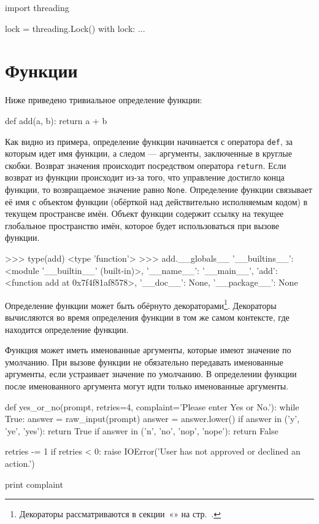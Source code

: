 \begin{pylst}{}{}
import threading

lock = threading.Lock()
with lock: ...
\end{pylst}

\section{Функции}
Ниже приведено тривиальное определение функции:
\begin{pylst}{}{}
def add(a, b):
    return a + b
\end{pylst}

Как видно из примера, определение функции начинается с оператора \lstinline{def}, за которым идет имя функции, а следом — аргументы, заключенные в круглые скобки. Возврат значения происходит посредством оператора \lstinline{return}. Если возврат из функции происходит из-за того, что управление достигло конца функции, то возвращаемое значение равно \lstinline{None}. Определение функции связывает её имя с объектом функции (обёрткой над действительно исполняемым кодом) в текущем пространсве имён. Объект функции содержит ссылку на текущее глобальное пространство имён, которое будет использоваться при вызове функции.
\begin{pylst}{}{}
>>> type(add)
<type 'function'>
>>> add.__globals__
{'__builtins__': <module '__builtin__' (built-in)>,
 '__name__': '__main__', 'add': <function add at 0x7f4f81af8578>,
 '__doc__': None, '__package__': None}
\end{pylst}

Определение функции может быть обёрнуто декораторами\footnote{Декораторы рассматриваются в секции~«» на стр.~\pageref{sec:py-decorators}.}. Декораторы вычисляются во время определения функции в том же самом контексте, где находится определение функции.

Функция может иметь именованные аргументы, которые имеют значение по умолчанию. При вызове функции не обязательно передавать именованные аргументы, если устраивает значение по умолчанию. В определении функции после именованного аргумента могут идти только именованные аргументы.
\begin{pylst}{}{}
def yes_or_no(prompt, retries=4, complaint='Please enter Yes or No.'):
    while True:
        answer = raw_input(prompt)
        answer = answer.lower()
        if answer in ('y', 'ye', 'yes'):
            return True
        if answer in ('n', 'no', 'nop', 'nope'):
            return False

        retries -= 1
        if retries < 0:
            raise IOError('User has not approved or declined an action.')

        print complaint
\end{pylst}


